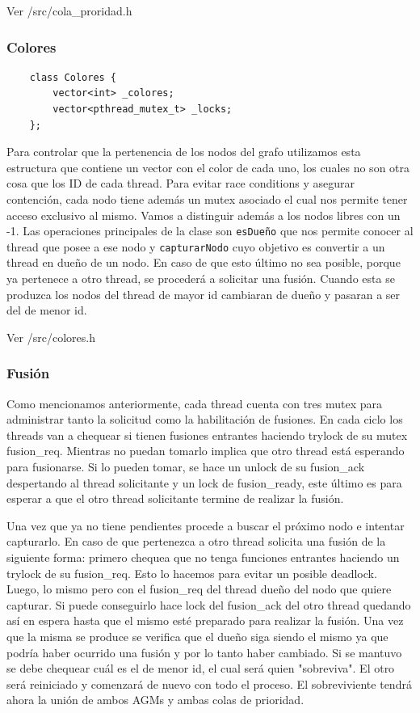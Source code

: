 Ver \textmd{/src/cola_proridad.h}

\subsubsection{Colores}

\begin{verbatim}
    class Colores {
        vector<int> _colores;
        vector<pthread_mutex_t> _locks;
    };
\end{verbatim}

Para controlar que la pertenencia de los nodos del grafo utilizamos esta estructura que contiene un vector con el color de cada uno, los cuales no son otra cosa que los ID de cada thread. Para evitar race conditions y asegurar contención, cada nodo tiene además un mutex asociado el cual nos permite tener acceso exclusivo al mismo. Vamos a distinguir además a los nodos libres con un -1.  Las operaciones principales de la clase son \texttt{esDueño} que nos permite conocer al thread que posee a ese nodo y \texttt{capturarNodo} cuyo objetivo es convertir a un thread en dueño de un nodo. En caso de que esto último no sea posible, porque ya pertenece a otro thread, se procederá a solicitar una fusión. Cuando esta se produzca los nodos del thread de mayor id cambiaran de dueño y pasaran a ser del de menor id.

Ver \textmd{/src/colores.h}

\subsubsection{Fusión}

Como mencionamos anteriormente, cada thread cuenta con tres mutex para administrar tanto la solicitud como la habilitación de fusiones. En cada ciclo los threads van a chequear si tienen fusiones entrantes haciendo trylock de su mutex fusion\_req. Mientras no puedan tomarlo implica que otro thread está esperando para fusionarse. Si lo pueden tomar, se hace un unlock de su fusion\_ack despertando al thread solicitante y un lock de fusion\_ready, este último es para esperar a que el otro thread solicitante termine de realizar la fusión.

Una vez que ya no tiene pendientes procede a buscar el próximo nodo e intentar capturarlo. En caso de que pertenezca a otro thread solicita una fusión de la siguiente forma: primero chequea que no tenga funciones entrantes haciendo un trylock de su fusion\_req. Esto lo hacemos para evitar un posible deadlock. Luego, lo mismo pero con el fusion\_req del thread dueño del nodo que quiere capturar. Si puede conseguirlo hace lock del fusion\_ack del otro thread quedando así en espera hasta que el mismo esté preparado para realizar la fusión. Una vez que la misma se produce se verifica que el dueño siga siendo el mismo ya que podría haber ocurrido una fusión y por lo tanto haber cambiado. Si se mantuvo se debe chequear cuál es el de menor id, el cual será quien "sobreviva". El otro será reiniciado y comenzará de nuevo con todo el proceso. El sobreviviente tendrá ahora la unión de ambos AGMs y ambas colas de prioridad.

